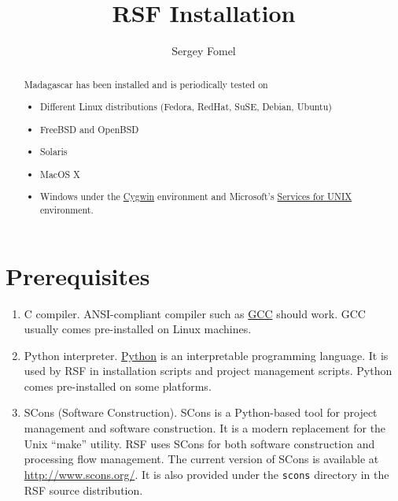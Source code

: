 \title{RSF Installation}
\author{Sergey Fomel}

%

\maketitle

\begin{abstract}
Madagascar has been installed and is periodically tested on
\begin{itemize}
\item Different Linux distributions (Fedora, RedHat, SuSE, Debian, Ubuntu)
\item FreeBSD and OpenBSD
\item Solaris
\item MacOS X
\item Windows under the \href{http://www.cygwin.com/}{Cygwin} environment and 
Microsoft's \href{http://www.microsoft.com/technet/interopmigration/unix/sfu/default.mspx}{Services for UNIX} environment.
\end{itemize}
\end{abstract}

\section{Prerequisites}

\begin{enumerate}
\item C compiler. ANSI-compliant compiler such as
  \href{http://gcc.gnu.org/}{GCC} should work. GCC usually comes pre-installed
  on Linux machines.
\item Python interpreter. \href{http://www.python.org/}{Python} is an
  interpretable programming language. It is used by RSF in installation
  scripts and project management scripts.  Python comes pre-installed on
  some platforms.
\item SCons (Software Construction). SCons is a Python-based tool for project
  management and software construction. It is a modern replacement for the
  Unix ``make'' utility. RSF uses SCons for both software construction and
  processing flow management. The current version of SCons is available at
  \url{http://www.scons.org/}. It is also provided under the \texttt{scons}
  directory in the RSF source distribution.
\end{enumerate}

